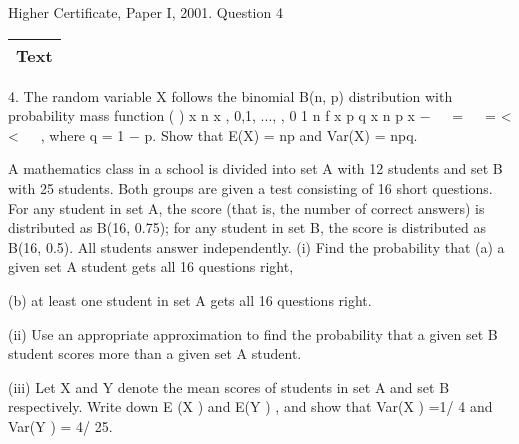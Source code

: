 \documentclass[a4paper,12pt]{article}
\begin{document}
Higher Certificate, Paper I, 2001. Question 4\begin{table}[ht!]
 \centering
 \begin{tabular}{|p{15cm}|}
 \hline
\noindent Text
\\ \hline
  \end{tabular}
\end{table}



4. The random variable X follows the binomial B(n, p) distribution with probability
mass function
( ) x n x , 0,1, ..., , 0 1 n
f x p q x n p
x
−  
=   = < <
 
,
where q = 1 − p. Show that E(X) = np and Var(X) = npq.

A mathematics class in a school is divided into set A with 12 students and set B
with 25 students. Both groups are given a test consisting of 16 short questions.
For any student in set A, the score (that is, the number of correct answers) is
distributed as B(16, 0.75); for any student in set B, the score is distributed as
B(16, 0.5). All students answer independently.
(i) Find the probability that
(a) a given set A student gets all 16 questions right,

(b) at least one student in set A gets all 16 questions right.

(ii) Use an appropriate approximation to find the probability that a given set B
student scores more than a given set A student.

(iii) Let X and Y denote the mean scores of students in set A and set B
respectively. Write down E (X ) and E(Y ) , and show that
Var(X ) =1/ 4 and Var(Y ) = 4/ 25.
\end{document}
